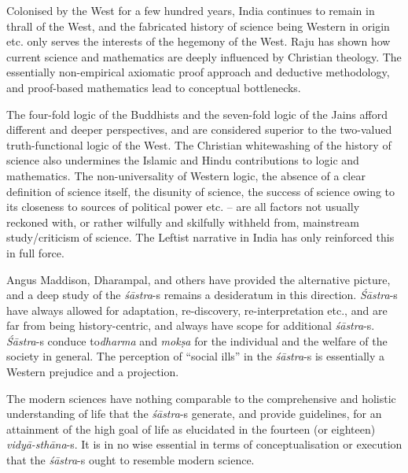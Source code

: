 Colonised by the West for a few hundred years, India continues to remain in thrall of the West, and the fabricated history of science being Western in origin etc. only serves the interests of the hegemony of the West. Raju has shown how current science and mathematics are deeply influenced by Christian theology. The essentially non-empirical axiomatic proof approach and deductive methodology, and proof-based mathematics lead to conceptual bottlenecks.

The four-fold logic of the Buddhists and the seven-fold logic of the Jains afford different and deeper perspectives, and are considered superior to the two-valued truth-functional logic of the West. The Christian whitewashing of the history of science also undermines the Islamic and Hindu contributions to logic and mathematics. The non-universality of Western logic, the absence of a clear definition of science itself, the disunity of science, the success of science owing to its closeness to sources of political power etc. – are all factors not usually reckoned with, or rather wilfully and skilfully withheld from, mainstream study/criticism of science. The Leftist narrative in India has only reinforced this in full force.

Angus Maddison, Dharampal, and others have provided the alternative picture, and a deep study of the \textit{śāstra}-s remains a desideratum in this direction. \textit{Śāstra}-s have always allowed for adaptation, re-dis\-covery, re-interpretation etc., and are far from being history-centric, and always have scope for additional \textit{śāstra}-s. \textit{Śāstra}-s conduce to\break \textit{dharma} and \textit{mokṣa} for the individual and the welfare of the society in general. The perception of ``social ills'' in the \textit{śāstra}-s is essentially a Western prejudice and a projection.

\eject

The modern sciences have nothing comparable to the comprehensive and holistic understanding of life that the \textit{śāstra}-s generate, and provide guidelines, for an attainment of the high goal of life as elucidated in the fourteen (or eighteen) \textit{vidyā-sthāna}-s. It is in no wise essential in terms of conceptualisation or execution that the \textit{śāstra}-s ought to resemble modern science.

